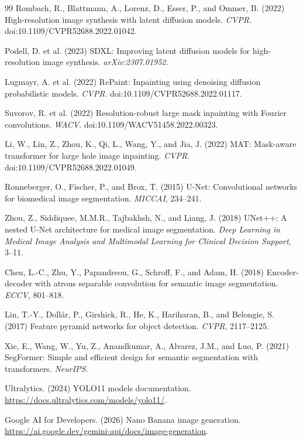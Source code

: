 \documentclass{article}
\begin{document}
{\begin{thebibliography}{99}
Rombach, R., Blattmann, A., Lorenz, D., Esser, P., and Ommer, B. (2022) High-resolution image synthesis with latent diffusion models. \textit{CVPR}. doi:10.1109/CVPR52688.2022.01042.

Podell, D. et al. (2023) SDXL: Improving latent diffusion models for high-resolution image synthesis. \textit{arXiv:2307.01952}.

Lugmayr, A. et al. (2022) RePaint: Inpainting using denoising diffusion probabilistic models. \textit{CVPR}. doi:10.1109/CVPR52688.2022.01117.

Suvorov, R. et al. (2022) Resolution-robust large mask inpainting with Fourier convolutions. \textit{WACV}. doi:10.1109/WACV51458.2022.00323.

Li, W., Lin, Z., Zhou, K., Qi, L., Wang, Y., and Jia, J. (2022) MAT: Mask-aware transformer for large hole image inpainting. \textit{CVPR}. doi:10.1109/CVPR52688.2022.01049.

Ronneberger, O., Fischer, P., and Brox, T. (2015) U-Net: Convolutional networks for biomedical image segmentation. \textit{MICCAI}, 234--241.

Zhou, Z., Siddiquee, M.M.R., Tajbakhsh, N., and Liang, J. (2018) UNet++: A nested U-Net architecture for medical image segmentation. \textit{Deep Learning in Medical Image Analysis and Multimodal Learning for Clinical Decision Support}, 3--11.

Chen, L.-C., Zhu, Y., Papandreou, G., Schroff, F., and Adam, H. (2018) Encoder-decoder with atrous separable convolution for semantic image segmentation. \textit{ECCV}, 801--818.

Lin, T.-Y., Doll\'ar, P., Girshick, R., He, K., Hariharan, B., and Belongie, S. (2017) Feature pyramid networks for object detection. \textit{CVPR}, 2117--2125.

Xie, E., Wang, W., Yu, Z., Anandkumar, A., Alvarez, J.M., and Luo, P. (2021) SegFormer: Simple and efficient design for semantic segmentation with transformers. \textit{NeurIPS}.

Ultralytics. (2024) YOLO11 models documentation. \url{https://docs.ultralytics.com/models/yolo11/}.

Google AI for Developers. (2026) Nano Banana image generation. \url{https://ai.google.dev/gemini-api/docs/image-generation}.

\end{thebibliography}

}
\end{document}
